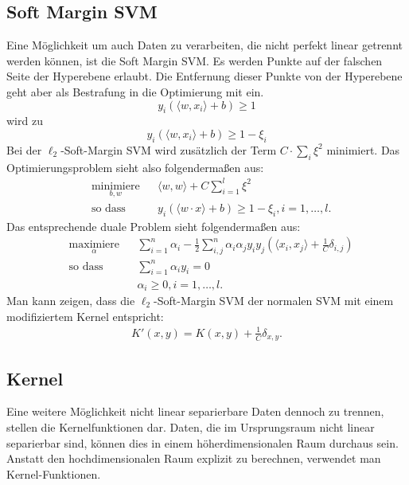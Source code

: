 \documentclass[ngerman]{scrartcl}
\begin{document}
\subsection{Soft Margin SVM}
Eine Möglichkeit um auch Daten zu verarbeiten, die nicht perfekt linear getrennt werden können, ist die Soft Margin SVM.
Es werden Punkte auf der falschen Seite der Hyperebene erlaubt.
Die Entfernung dieser Punkte von der Hyperebene geht aber als Bestrafung in die Optimierung mit ein.
\begin{equation}
y_i (\langle w,x_i\rangle + b) \geq 1
\end{equation}
wird zu
\begin{equation}
y_i (\langle w,x_i\rangle + b) \geq 1 - \xi_i
\end{equation}
Bei der $\ell_2$-Soft-Margin SVM wird zusätzlich der Term $C \cdot \sum_i \xi^2$ minimiert. Das Optimierungsproblem sieht also folgendermaßen aus:
\begin{align}
&\underset{b,w}{\text{minimiere}} &&\langle w,w \rangle + C \sum_{i=1}^l \xi^2\\
&\text{so dass } && y_i (\langle w \cdot x \rangle + b) \geq 1 - \xi_i , i = 1, \ldots , l. \nonumber
\end{align}
Das entsprechende duale Problem sieht folgendermaßen aus:
\begin{align}
&\underset{\alpha}{\text{maximiere}} && \sum_{i=1}^n \alpha_i - \frac{1}{2} \sum_{i,j}^n \alpha_i \alpha_j y_i y_j \left( \langle x_i, x_j \rangle + \frac{1}{C} \delta_{i,j}\right)  \\
&\text{so dass } && \sum_{i=1}^n \alpha_i y_i = 0 \\
&&&  \alpha_i \geq 0, i = 1, \ldots  ,l.
\end{align}
Man kann zeigen, dass die $\ell_2$-Soft-Margin SVM der normalen SVM mit einem modifiziertem Kernel entspricht:
\begin{align}
K'(x,y) = K(x,y) + \frac{1}{C} \delta_{x,y}.
\end{align}

\subsection{Kernel}
Eine weitere Möglichkeit nicht linear separierbare Daten dennoch zu trennen, stellen die Kernelfunktionen dar.
Daten, die im Ursprungsraum nicht linear separierbar sind, können dies in einem höherdimensionalen Raum durchaus sein. 
Anstatt den hochdimensionalen Raum explizit zu berechnen, verwendet man Kernel-Funktionen.
 
\end{document}
